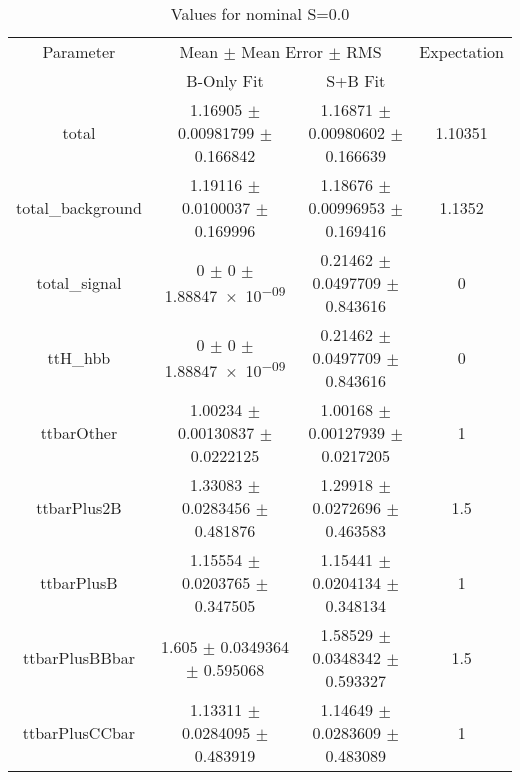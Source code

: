 \begin{table}
\centering
\caption{Values for nominal S=0.0}
\begin{tabular}{cccc}
\toprule
Parameter & \multicolumn{2}{c}{Mean $\pm$ Mean Error $\pm$ RMS} & Expectation\\
 & B-Only Fit & S+B Fit & \\
\midrule
total & \num{1.16905} $\pm$ \num{0.00981799} $\pm$ \num{0.166842} & \num{1.16871} $\pm$ \num{0.00980602} $\pm$ \num{0.166639} & \num{1.10351}\\
total\_background & \num{1.19116} $\pm$ \num{0.0100037} $\pm$ \num{0.169996} & \num{1.18676} $\pm$ \num{0.00996953} $\pm$ \num{0.169416} & \num{1.1352}\\
total\_signal & \num{0} $\pm$ \num{0} $\pm$ \num{1.88847e-09} & \num{0.21462} $\pm$ \num{0.0497709} $\pm$ \num{0.843616} & \num{0}\\
ttH\_hbb & \num{0} $\pm$ \num{0} $\pm$ \num{1.88847e-09} & \num{0.21462} $\pm$ \num{0.0497709} $\pm$ \num{0.843616} & \num{0}\\
ttbarOther & \num{1.00234} $\pm$ \num{0.00130837} $\pm$ \num{0.0222125} & \num{1.00168} $\pm$ \num{0.00127939} $\pm$ \num{0.0217205} & \num{1}\\
ttbarPlus2B & \num{1.33083} $\pm$ \num{0.0283456} $\pm$ \num{0.481876} & \num{1.29918} $\pm$ \num{0.0272696} $\pm$ \num{0.463583} & \num{1.5}\\
ttbarPlusB & \num{1.15554} $\pm$ \num{0.0203765} $\pm$ \num{0.347505} & \num{1.15441} $\pm$ \num{0.0204134} $\pm$ \num{0.348134} & \num{1}\\
ttbarPlusBBbar & \num{1.605} $\pm$ \num{0.0349364} $\pm$ \num{0.595068} & \num{1.58529} $\pm$ \num{0.0348342} $\pm$ \num{0.593327} & \num{1.5}\\
ttbarPlusCCbar & \num{1.13311} $\pm$ \num{0.0284095} $\pm$ \num{0.483919} & \num{1.14649} $\pm$ \num{0.0283609} $\pm$ \num{0.483089} & \num{1}\\
\bottomrule
\end{tabular}
\end{table}